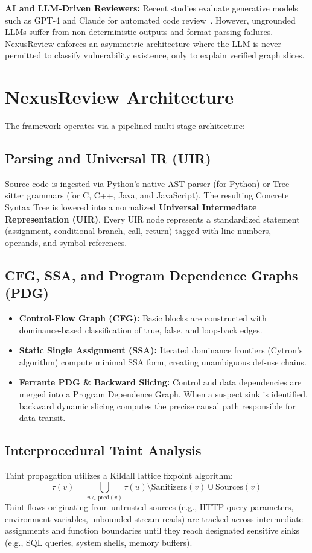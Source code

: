 \documentclass[10pt,conference]{IEEEtran}
\begin{document}
\textbf{AI and LLM-Driven Reviewers:} Recent studies evaluate generative models such as GPT-4 and Claude for automated code review~\cite{deputydev}. However, ungrounded LLMs suffer from non-deterministic outputs and format parsing failures. NexusReview enforces an asymmetric architecture where the LLM is never permitted to classify vulnerability existence, only to explain verified graph slices.

\section{NexusReview Architecture}

The framework operates via a pipelined multi-stage architecture:

\subsection{Parsing and Universal IR (UIR)}
Source code is ingested via Python's native AST parser (for Python) or Tree-sitter grammars (for C, C++, Java, and JavaScript). The resulting Concrete Syntax Tree is lowered into a normalized \textbf{Universal Intermediate Representation (UIR)}. Every UIR node represents a standardized statement (assignment, conditional branch, call, return) tagged with line numbers, operands, and symbol references.

\subsection{CFG, SSA, and Program Dependence Graphs (PDG)}
\begin{itemize}
    \item \textbf{Control-Flow Graph (CFG):} Basic blocks are constructed with dominance-based classification of true, false, and loop-back edges.
    \item \textbf{Static Single Assignment (SSA):} Iterated dominance frontiers (Cytron's algorithm) compute minimal SSA form, creating unambiguous def-use chains.
    \item \textbf{Ferrante PDG \& Backward Slicing:} Control and data dependencies are merged into a Program Dependence Graph. When a suspect sink is identified, backward dynamic slicing computes the precise causal path responsible for data transit.
\end{itemize}

\subsection{Interprocedural Taint Analysis}
Taint propagation utilizes a Kildall lattice fixpoint algorithm:
\begin{equation}
\tau(v) = \bigcup_{u \in \text{pred}(v)} \tau(u) \setminus \text{Sanitizers}(v) \cup \text{Sources}(v)
\end{equation}
Taint flows originating from untrusted sources (e.g., HTTP query parameters, environment variables, unbounded stream reads) are tracked across intermediate assignments and function boundaries until they reach designated sensitive sinks (e.g., SQL queries, system shells, memory buffers).
\end{document}
